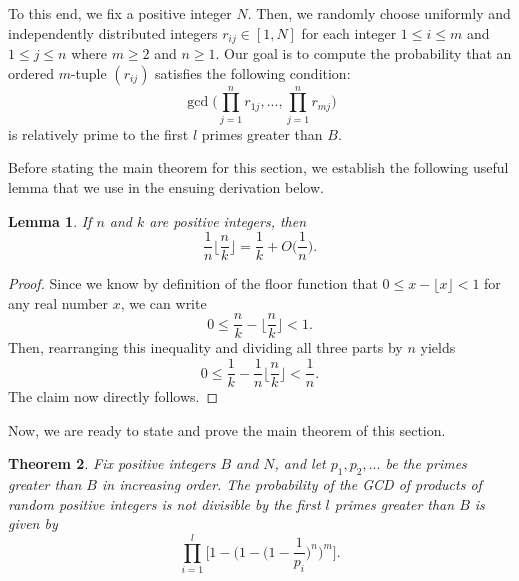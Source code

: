 \documentclass[12pt]{amsart}
\newtheorem{theorem}{Theorem}[subsection]
\newtheorem{lemma}[theorem]{Lemma}
\theoremstyle{definition}
\begin{document}
\vspace{.1 in}

To this end, we fix a positive integer $N$. Then, we randomly choose uniformly and independently distributed  integers $r_{ij} \in [1, N]$ for each integer $1 \leq i \leq m$ and $1 \leq j \leq n$ where $m \geq 2$ and $n \geq 1$. Our goal is to compute the probability that an ordered $m$-tuple $(r_{ij})$ satisfies the following condition:
$$\gcd\Big(\prod_{j=1}^nr_{1j}, ..., \prod_{j=1}^n r_{mj}\Big)$$
is relatively prime to the first $l$ primes greater than $B$. 

Before stating the main theorem for this section, we establish the following useful lemma that we use in the ensuing derivation below.

\begin{lemma} If $n$ and $k$ are positive integers, then
	$$\frac{1}{n} \Big\lfloor \frac{n}{k} \Big\rfloor = \frac{1}{k} + O\Big(\frac{1}{n}\Big).$$
\end{lemma}

\begin{proof}
	Since we know by definition of the floor function that $0 \leq x - \lfloor x \rfloor < 1$ for any real number $x$, we can write
	$$0 \leq \frac{n}{k} - \Big\lfloor \frac{n}{k} \Big\rfloor < 1.$$
	Then, rearranging this inequality and dividing all three parts by $n$ yields
	$$0 \leq \frac{1}{k} - \frac{1}{n}\Big\lfloor \frac{n}{k}\Big\rfloor < \frac{1}{n}.$$
	The claim now directly follows.
\end{proof}

Now, we are ready to state and prove the main theorem of this section.

\begin{theorem}
	Fix positive integers $B$ and $N$, and let $p_1, p_2, ...$ be the primes greater than $B$ in increasing order. The probability of the GCD of products of random positive integers is not divisible by the first $l$ primes greater than $B$ is given by \label{probability-random-first-l}
	$$\prod_{i=1}^{l} \Big[1 - \Big(1 - \Big(1-\frac{1}{p_i}\Big)^n\Big)^m\Big].$$
\end{theorem}
\end{document}
